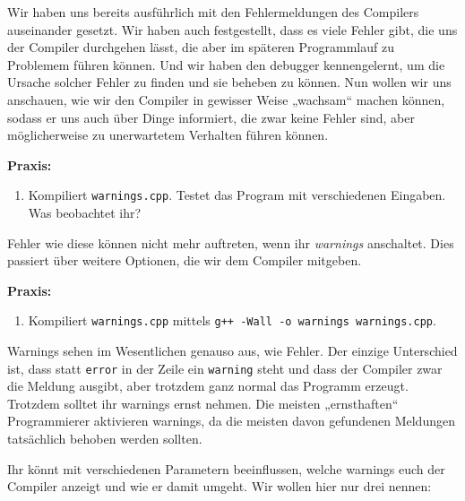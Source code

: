 
Wir haben uns bereits ausführlich mit den Fehlermeldungen des Compilers
auseinander gesetzt. Wir haben auch festgestellt, dass es viele Fehler gibt,
die uns der Compiler durchgehen lässt, die aber im späteren Programmlauf zu
Problemem führen können. Und wir haben den debugger kennengelernt, um die
Ursache solcher Fehler zu finden und sie beheben zu können. Nun wollen wir uns
anschauen, wie wir den Compiler in gewisser Weise „wachsam“ machen können,
sodass er uns auch über Dinge informiert, die zwar keine Fehler sind, aber
möglicherweise zu unerwartetem Verhalten führen können.

\textbf{Praxis:}
\begin{enumerate}
    \item Kompiliert \texttt{warnings.cpp}. Testet das Program mit
        verschiedenen Eingaben. Was beobachtet ihr?
\end{enumerate}

Fehler wie diese können nicht mehr auftreten, wenn ihr \emph{warnings}
anschaltet. Dies passiert über weitere Optionen, die wir dem Compiler mitgeben.

\textbf{Praxis:}
\begin{enumerate}[resume]
    \item Kompiliert \texttt{warnings.cpp} mittels \texttt{g++ -Wall -o
        warnings warnings.cpp}.
\end{enumerate}

Warnings sehen im Wesentlichen genauso aus, wie Fehler. Der einzige Unterschied
ist, dass statt \texttt{error} in der Zeile ein \texttt{warning} steht und dass
der Compiler zwar die Meldung ausgibt, aber trotzdem ganz normal das Programm
erzeugt. Trotzdem solltet ihr warnings ernst nehmen. Die meisten „ernsthaften“
Programmierer aktivieren warnings, da die meisten davon gefundenen Meldungen
tatsächlich behoben werden sollten.

Ihr könnt mit verschiedenen Parametern beeinflussen, welche warnings euch der
Compiler anzeigt und wie er damit umgeht. Wir wollen hier nur drei nennen:

